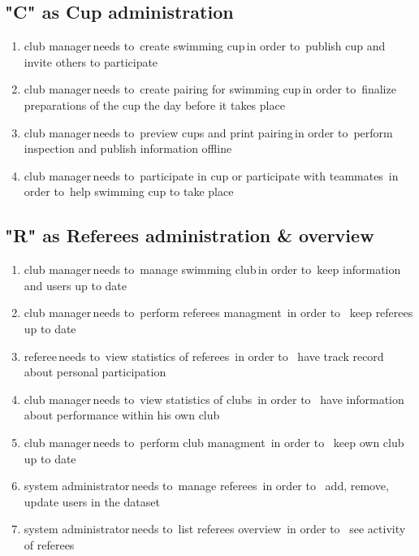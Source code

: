 \subsection*{"C" as Cup administration}
\begin{enumerate}
    \item \lbrack club manager\rbrack \,needs to\, \lbrack create swimming cup\rbrack \,in order to\, \lbrack publish cup and invite others to participate\rbrack
    \item \lbrack club manager\rbrack \,needs to\, \lbrack create pairing for swimming cup\rbrack \,in order to\, \lbrack finalize preparations of the cup the day before it takes place\rbrack
    \item \lbrack club manager\rbrack \,needs to\, \lbrack preview cups and print pairing\rbrack \,in order to\, \lbrack perform inspection and publish information offline\rbrack
    \item \lbrack club manager\rbrack \,needs to\, \lbrack participate in cup or participate with teammates\rbrack \, in order to\, \lbrack help swimming cup to take place\rbrack
\end{enumerate} 
\subsection*{"R" as Referees administration \& overview}
\begin{enumerate}
\item \lbrack club manager\rbrack \,needs to\, \lbrack manage swimming club\rbrack \,in order to\, \lbrack keep information and users up to date\rbrack
\item \lbrack club manager\rbrack \,needs to\, \lbrack perform referees managment\rbrack \, in order to \, \lbrack keep referees up to date\rbrack
\item \lbrack referee\rbrack \,needs to\, \lbrack view statistics of referees\rbrack \, in order to \, \lbrack have track record about personal participation\rbrack
\item \lbrack club manager\rbrack \,needs to\, \lbrack view statistics of clubs\rbrack \, in order to \, \lbrack have information about performance within his own club\rbrack
\item \lbrack club manager\rbrack \,needs to\, \lbrack perform club managment\rbrack \, in order to \, \lbrack keep own club up to date\rbrack
\item \lbrack system administrator\rbrack \,needs to\, \lbrack manage referees\rbrack \, in order to \, \lbrack add, remove, update users in the dataset\rbrack
\item \lbrack system administrator\rbrack \,needs to\, \lbrack list referees overview\rbrack \, in order to \, \lbrack see activity of referees\rbrack
\end{enumerate} 
